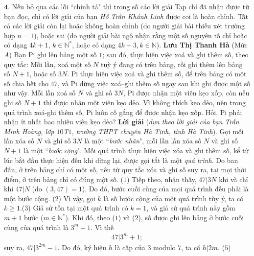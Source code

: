 \begin{multicols}{2}
	\vskip 0.05cm
	$\pmb{4.}$ Nếu bỏ qua các lỗi ``chính tả" thì trong số các lời giải Tạp chí đã nhận được từ bạn đọc, chỉ có lời giải của bạn \textit{Hồ Trần Khánh Linh} được coi là hoàn chỉnh. Tất cả các lời giải còn lại hoặc không hoàn chỉnh (do người giải bài thiếu xét trường hợp $n = 1$), hoặc sai (do người giải bài ngộ nhận rằng một số nguyên tố chỉ hoặc có dạng $4k + 1$, $k \in \mathbb{N^*}$, hoặc có dạng $4k + 3, k\in \mathbb{N}$).
	\vskip 0.05cm
	\hfill \textbf{\color{thachthuctoanhoc}Lưu Thị Thanh Hà}
	\vskip 0.05cm
	{}
	(Mức $A$) Bạn Pi ghi lên bảng một số $1$; sau đó, thực hiện việc xoá và ghi thêm số, theo quy tắc:  Mỗi lần, xoá một số $N$ tuỳ ý đang có trên bảng, rồi ghi thêm lên bảng số $N+1$,  hoặc số $3N$.
	\vskip 0.05cm
	Pi thực hiện việc xoá và ghi thêm số, để trên bảng có một số chia hết cho $47$, và Pi dừng việc xoá--ghi thêm số ngay sau khi ghi được một số như vậy. 
	\vskip 0.05cm
	Mỗi lần xoá số $N$ và ghi số $3N$, Pi được nhận một viên kẹo xốp, còn nếu ghi số $N+1$ thì được nhận một viên kẹo dẻo. Vì không thích kẹo dẻo, nên trong quá trình xoá-ghi thêm số, Pi luôn cố gắng để được nhận kẹo xốp. Hỏi, Pi phải nhận ít nhất bao nhiêu viên kẹo dẻo? 
	\vskip 0.05cm
	\textbf{\color{thachthuctoanhoc}Lời giải} (\textit{dựa theo lời giải của bạn Trần Minh Hoàng, lớp $10$T$1$, trường THPT chuyên Hà Tĩnh, tỉnh Hà Tĩnh}).
	\vskip 0.05cm
	Gọi mỗi lần xóa số $N$ và ghi số $3N$ là một ``\textit{bước nhân}", mỗi lần lần xóa số $N$ và ghi số $N + 1$ là một ``\textit{bước cộng}".
	\vskip 0.05cm
	Mỗi quá trình thực hiện việc xóa và ghi thêm số, kể từ lúc bắt đầu thực hiện đến khi dừng lại, được gọi tắt là một \textit{quá trình}.
	\vskip 0.05cm
	Do ban đầu, ở trên bảng chỉ có một số, nên từ quy tắc xóa và ghi số suy ra, tại mọi thời điểm, ở trên bảng chỉ có đúng một số.            \hfill ($1$)
	\vskip 0.05cm
	Tiếp theo, nhận thấy, $47|3N$  khi và chỉ khi $47|N$  (do $(3, 47) = 1$). Do đó, bước cuối cùng của mọi quá trình đều phải là một bước cộng. \hfill ($2$)
	\vskip 0.05cm
	Vì vậy, gọi $k$ là số bước cộng của một quá trình tùy ý, ta có $k \ge 1$.\hfill ($3$)
	\vskip 0.05cm
	Giả sử tồn tại một quá trình có $k = 1$, và giả sử quá trình này gồm $m + 1$ bước ($m \in \mathbb{N^*}$).
	\vskip 0.05cm
	Khi đó, theo ($1$) và ($2$), số được ghi lên bảng ở bước cuối cùng của quá trình là $3^m + 1$. Vì thế
	\begin{align*}
		47|{3^m} + 1; \tag{$4$}
	\end{align*}
	suy ra,  $47|{3^{2m}} - 1$. Do đó, ký hiệu $h$ là cấp của $3$ modulo $7$, ta có  $h|2m$. \hfill   ($5$)

\end{multicols}
